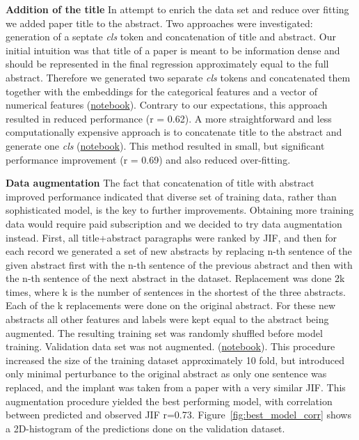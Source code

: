 \documentclass[11pt]{article}
\begin{document}
\textbf{Addition of the title} In attempt to enrich the data set and reduce over fitting we added paper title to the abstract. Two approaches were investigated: generation of a septate \textit{cls}  token and concatenation of title and abstract. Our initial intuition was that title of a paper is meant to be information dense and should be represented in the final regression approximately equal to the full abstract. Therefore we generated two separate \textit{cls} tokens and concatenated them together with the embeddings for the categorical features and a vector of numerical features (\href{https://github.com/ArtemChemist/w266_project/blob/main/Notebooks/sciBERT%20%2B%20sciBERT%20%2B%20small%20meta.ipynb}{notebook}). Contrary to our expectations, this approach resulted in reduced performance (r = 0.62). A more straightforward and less computationally expensive approach is to concatenate title to the abstract and generate one \textit{cls} (\href{https://github.com/ArtemChemist/w266_project/blob/main/Notebooks/sciBERT%20w%20tit%2Babs.ipynb}{notebook}). This method resulted in small, but significant performance improvement (r = 0.69) and also reduced over-fitting.

\textbf{Data augmentation} The fact that concatenation of title with abstract improved performance indicated that diverse set of training data, rather than sophisticated model, is the key to further improvements. Obtaining more training data would require paid subscription and we decided to try data augmentation instead. First, all title+abstract paragraphs were ranked by JIF, and then for each record we generated a set of new abstracts by replacing n-th sentence of the given abstract first with the n-th sentence of the previous abstract and then with the n-th sentence of the next abstract in the dataset. Replacement was done 2k times, where k is the number of sentences in the shortest of the three abstracts. Each of the k replacements were done on the original abstract. For these new abstracts all other features and labels were kept equal to the abstract being augmented. The resulting training set was randomly shuffled before model training. Validation data set was not augmented. (\href{https://github.com/ArtemChemist/w266_project/blob/main/Notebooks/sciBERT%20aug.ipynb}{notebook}).   This procedure increased the size of the training dataset approximately 10 fold, but introduced only minimal perturbance to the original abstract as only one sentence was replaced, and the implant was taken from a paper with a very similar JIF. This augmentation procedure yielded the best performing model, with correlation between predicted and observed JIF r=0.73. Figure~\ref{fig:best_model_corr} shows a 2D-histogram of the predictions done on the validation dataset.
\end{document}
